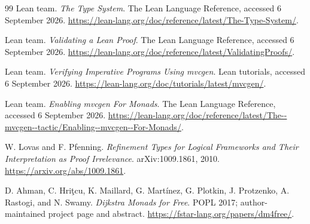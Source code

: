 \documentclass[11pt,letterpaper]{article}
\theoremstyle{definition}
\theoremstyle{remark}
\begin{document}
\begin{thebibliography}{99}
Lean team. \emph{The Type System}. The Lean Language Reference, accessed
6 September 2026.
\url{https://lean-lang.org/doc/reference/latest/The-Type-System/}.

Lean team. \emph{Validating a Lean Proof}. The Lean Language Reference, accessed
6 September 2026.
\url{https://lean-lang.org/doc/reference/latest/ValidatingProofs/}.

Lean team. \emph{Verifying Imperative Programs Using mvcgen}. Lean tutorials,
accessed 6 September 2026.
\url{https://lean-lang.org/doc/tutorials/latest/mvcgen/}.

Lean team. \emph{Enabling mvcgen For Monads}. The Lean Language Reference,
accessed 6 September 2026.
\url{https://lean-lang.org/doc/reference/latest/The--mvcgen--tactic/Enabling--mvcgen--For-Monads/}.

W. Lovas and F. Pfenning. \emph{Refinement Types for Logical Frameworks and
Their Interpretation as Proof Irrelevance}. arXiv:1009.1861, 2010.
\url{https://arxiv.org/abs/1009.1861}.

D. Ahman, C. Hri\c{t}cu, K. Maillard, G. Mart\'inez, G. Plotkin,
J. Protzenko, A. Rastogi, and N. Swamy. \emph{Dijkstra Monads for Free}.
POPL 2017; author-maintained project page and abstract.
\url{https://fstar-lang.org/papers/dm4free/}.
\end{thebibliography}
\end{document}
